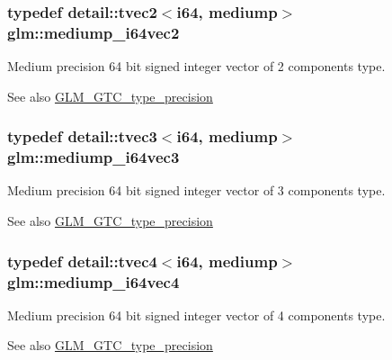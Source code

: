 \subsubsection[{\texorpdfstring{mediump\+\_\+i64vec2}{mediump_i64vec2}}]{\setlength{\rightskip}{0pt plus 5cm}typedef detail\+::tvec2$<$i64, mediump$>$ {\bf glm\+::mediump\+\_\+i64vec2}}\hypertarget{group__gtc__type__precision_ga5cf0bec13b01b6124e966360cffe15a4}{}\label{group__gtc__type__precision_ga5cf0bec13b01b6124e966360cffe15a4}
Medium precision 64 bit signed integer vector of 2 components type. \begin{DoxySeeAlso}{See also}
\hyperlink{group__gtc__type__precision}{G\+L\+M\+\_\+\+G\+T\+C\+\_\+type\+\_\+precision} 
\end{DoxySeeAlso}
\subsubsection[{\texorpdfstring{mediump\+\_\+i64vec3}{mediump_i64vec3}}]{\setlength{\rightskip}{0pt plus 5cm}typedef detail\+::tvec3$<$i64, mediump$>$ {\bf glm\+::mediump\+\_\+i64vec3}}\hypertarget{group__gtc__type__precision_gae1aa82d2b9a62a87648306205dfe69ab}{}\label{group__gtc__type__precision_gae1aa82d2b9a62a87648306205dfe69ab}
Medium precision 64 bit signed integer vector of 3 components type. \begin{DoxySeeAlso}{See also}
\hyperlink{group__gtc__type__precision}{G\+L\+M\+\_\+\+G\+T\+C\+\_\+type\+\_\+precision} 
\end{DoxySeeAlso}
\subsubsection[{\texorpdfstring{mediump\+\_\+i64vec4}{mediump_i64vec4}}]{\setlength{\rightskip}{0pt plus 5cm}typedef detail\+::tvec4$<$i64, mediump$>$ {\bf glm\+::mediump\+\_\+i64vec4}}\hypertarget{group__gtc__type__precision_gab4db11ebb425fa18fe5d15d455c360a3}{}\label{group__gtc__type__precision_gab4db11ebb425fa18fe5d15d455c360a3}
Medium precision 64 bit signed integer vector of 4 components type. \begin{DoxySeeAlso}{See also}
\hyperlink{group__gtc__type__precision}{G\+L\+M\+\_\+\+G\+T\+C\+\_\+type\+\_\+precision} 
\end{DoxySeeAlso}
